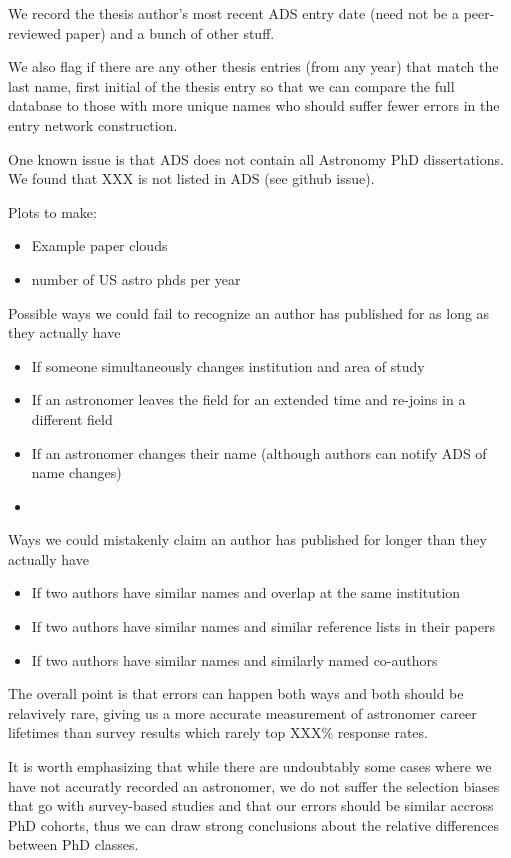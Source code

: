 \documentclass{emulateapj}
\begin{document}
We record the thesis author's most recent ADS entry date (need not be a peer-reviewed paper)  and a bunch of other stuff.

We also flag if there are any other thesis entries (from any year) that match the last name, first initial of the thesis entry so that we can compare the full database to those with more unique names who should suffer fewer errors in the entry network construction.

One known issue is that ADS does not contain all Astronomy PhD dissertations. We found that XXX is not listed in ADS (see github issue).


Plots to make:
\begin{itemize}
\item{Example paper clouds}
\item{number of US astro phds per year}
\end{itemize}




Possible ways we could fail to recognize an author has published for as long as they actually have
\begin{itemize}
\item{If someone simultaneously changes institution and area of study}
  \item{If an astronomer leaves the field for an extended time and re-joins in a different field}
\item{If an astronomer changes their name (although authors can notify ADS of name changes)}
  \item{}
\end{itemize}

Ways we could mistakenly claim an author has published for longer than they actually have
\begin{itemize}
\item{If two authors have similar names and overlap at the same institution}
\item{If two authors have similar names and similar reference lists in their papers}
  \item{If two authors have similar names and similarly named co-authors}
\end{itemize}

The overall point is that errors can happen both ways and both should be relavively rare, giving us a more accurate measurement of astronomer career lifetimes than survey results which rarely top XXX\% response rates.

It is worth emphasizing that while there are undoubtably some cases where we have not accuratly recorded an astronomer, we do not suffer the selection biases that go with survey-based studies and that our errors should be similar accross PhD cohorts, thus we can draw strong conclusions about the relative differences between PhD classes.
\end{document}

